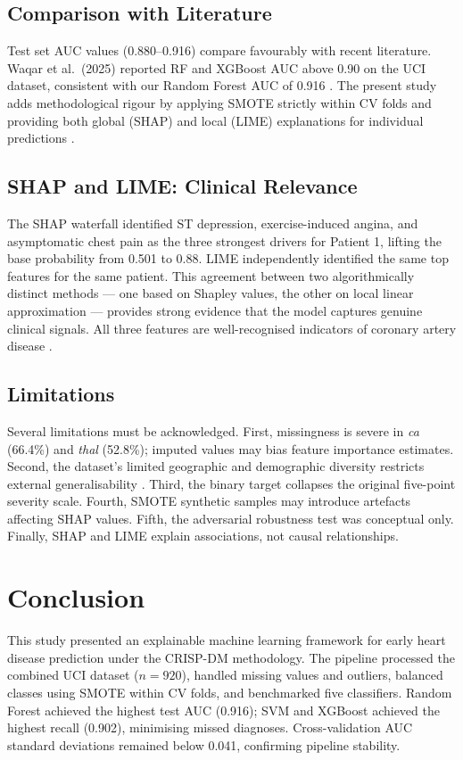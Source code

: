\documentclass[conference]{IEEEtran}
\begin{document}
\subsection{Comparison with Literature}
Test set AUC values (0.880--0.916) compare favourably with recent literature. Waqar et al.\ (2025) reported RF and XGBoost AUC above 0.90 on the UCI dataset, consistent with our Random Forest AUC of 0.916 \cite{lamir2025}. The present study adds methodological rigour by applying SMOTE strictly within CV folds and providing both global (SHAP) and local (LIME) explanations for individual predictions \cite{ahmed2024}.

\subsection{SHAP and LIME: Clinical Relevance}
The SHAP waterfall identified ST depression, exercise-induced angina, and asymptomatic chest pain as the three strongest drivers for Patient 1, lifting the base probability from 0.501 to 0.88. LIME independently identified the same top features for the same patient. This agreement between two algorithmically distinct methods — one based on Shapley values, the other on local linear approximation — provides strong evidence that the model captures genuine clinical signals. All three features are well-recognised indicators of coronary artery disease \cite{admassu2023, netayawijit2025}.

\subsection{Limitations}
Several limitations must be acknowledged. First, missingness is severe in \textit{ca} (66.4\%) and \textit{thal} (52.8\%); imputed values may bias feature importance estimates. Second, the dataset's limited geographic and demographic diversity restricts external generalisability \cite{strongman2019}. Third, the binary target collapses the original five-point severity scale. Fourth, SMOTE synthetic samples may introduce artefacts affecting SHAP values. Fifth, the adversarial robustness test was conceptual only. Finally, SHAP and LIME explain associations, not causal relationships.

\section{Conclusion}
This study presented an explainable machine learning framework for early heart disease prediction under the CRISP-DM methodology. The pipeline processed the combined UCI dataset ($n{=}920$), handled missing values and outliers, balanced classes using SMOTE within CV folds, and benchmarked five classifiers. Random Forest achieved the highest test AUC (0.916); SVM and XGBoost achieved the highest recall (0.902), minimising missed diagnoses. Cross-validation AUC standard deviations remained below 0.041, confirming pipeline stability.
\end{document}
